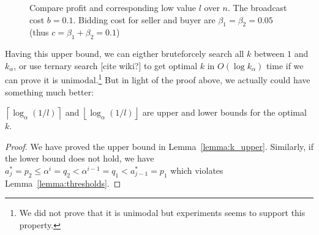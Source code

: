 \begin{figure}
\centering
  \caption{Compare profit and corresponding low value $l$ over $n$. The
  broadcast cost $b = 0.1$. Bidding cost for seller and buyer are $\beta_1 =
  \beta_2 = 0.05$ (thus $c = \beta_1+\beta_2 = 0.1$)}\label{fig:general}
\end{figure}

Having this upper bound, we can eigther bruteforcely search all $k$ between $1$
and $k_\alpha$, or use ternary search [cite wiki?] to get optimal $k$ in
$O(\log k_\alpha)$ time if we can prove it is unimodal.\footnote{We did not
prove that it is unimodal but experiments seems to support this property.}
But in light of the proof above, we actually could have something much better:

\begin{theorem}\label{theorem:k_bounds}
$\left\lceil \log_{\alpha} \left(1/l\right) \right\rceil$ and 
$\left\lfloor \log_{\alpha} \left(1/l\right) \right\rfloor$ are upper
and lower bounds for the optimal $k$. 
\end{theorem}

\begin{proof}
We have proved the upper bound in Lemma~\ref{lemma:k_upper}. Similarly, if the lower bound
does not hold, we have $a^*_j = p_2 \leq \alpha^i = q_2 < \alpha^{i-1} =
q_1 < a^*_{j-1} = p_1$ which violates Lemma~\ref{lemma:thresholds}. 
\end{proof}

